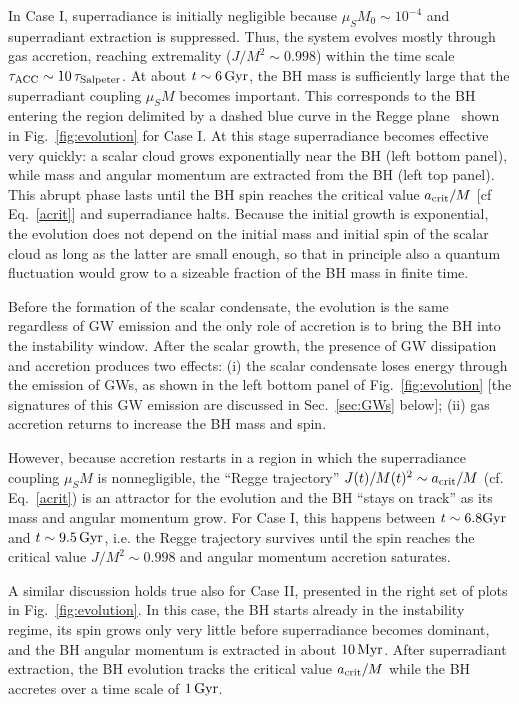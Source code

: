 \documentclass[11pt]{article}
\numberwithin{equation}{section} %
\begin{document}
In Case I, superradiance is initially negligible because $\mu_S M_0\sim 10^{-4}$ and superradiant extraction is suppressed. Thus, the system evolves mostly through gas accretion, reaching extremality ($J/M^2\sim0.998$) within the time scale $\tau_{\rm ACC}\sim 10\,\tau_{\rm Salpeter}$. At about $t\sim 6\,{\rm Gyr}$, the BH mass is sufficiently large that the superradiant coupling $\mu_S M$ becomes important. This corresponds to the BH entering the region delimited by a dashed blue curve in the Regge plane~\cite{Arvanitaki:2010sy} shown in Fig.~\ref{fig:evolution} for Case I. At this stage superradiance becomes effective very quickly: a scalar cloud grows exponentially near the BH (left bottom panel), while
mass and angular momentum are extracted from the BH (left top panel). This abrupt phase lasts until the BH spin reaches the critical value $a_{\rm crit}/M$ [cf Eq.~\eqref{acrit}] and superradiance halts. Because the initial growth is exponential, the evolution does not depend on the initial mass and initial spin of the scalar cloud as long as the latter are small enough, so that in principle also a quantum fluctuation would grow to a sizeable fraction of the BH mass in finite time. 

Before the formation of the scalar condensate, the evolution is the same regardless of GW emission and the only role of accretion is to bring the BH into the instability window.  After the scalar growth, the presence of GW dissipation and accretion produces two effects: (i) the scalar condensate loses energy through the emission of GWs, as shown in the left bottom panel of Fig.~\ref{fig:evolution} [the signatures of this GW emission are discussed in Sec.~\ref{sec:GWs} below]; (ii) gas accretion returns to increase the BH mass and spin.

However, because accretion restarts in a region in which the superradiance coupling $\mu_S M$ is nonnegligible, the ``Regge trajectory'' $J(t)/M(t)^2\sim a_{\rm crit}/M$ (cf. Eq.~\eqref{acrit}) is an attractor for the evolution and the BH ``stays on track'' as its mass and angular momentum grow. For Case I, this happens between $t\sim 6.8{\rm Gyr}$ and $t\sim9.5\,{\rm Gyr}$, i.e. the Regge trajectory survives until the spin reaches the critical value $J/M^2\sim 0.998$ and angular momentum accretion saturates. 



A similar discussion holds true also for Case II, presented in the right set of plots in Fig.~\ref{fig:evolution}. In this case, the BH starts already in the instability regime, its spin grows only very little before superradiance becomes dominant, and the BH angular momentum is extracted in about $10\,{\rm Myr}$. After superradiant extraction, the BH evolution tracks the critical value $a_{\rm crit}/M$ while the BH accretes over a time scale of $1\,{\rm Gyr}$. 
\end{document}
